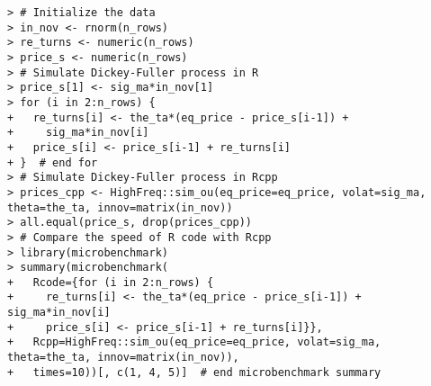 \documentclass[10pt]{beamer}\usepackage[]{graphicx}\usepackage[]{color}
\makeatletter
\newenvironment{kframe}{%
 \def\at@end@of@kframe{}%
 \ifinner\ifhmode%
  \def\at@end@of@kframe{\end{minipage}}%
  \begin{minipage}{\columnwidth}%
 \fi\fi%
 \def\FrameCommand##1{\hskip\@totalleftmargin \hskip-\fboxsep
 \colorbox{shadecolor}{##1}\hskip-\fboxsep
     \hskip-\linewidth \hskip-\@totalleftmargin \hskip\columnwidth}%
 \MakeFramed {\advance\hsize-\width
   \@totalleftmargin\z@ \linewidth\hsize
   \@setminipage}}%
 {\par\unskip\endMakeFramed%
 \at@end@of@kframe}
\newenvironment{knitrout}{}{} %
\makeatother
\begin{document}
\begin{frame}[fragile,t]{\subsecname}
\begin{block}{}
\begin{columns}[T]
\begin{knitrout}
\begin{kframe}
\begin{verbatim}
> # Initialize the data
> in_nov <- rnorm(n_rows)
> re_turns <- numeric(n_rows)
> price_s <- numeric(n_rows)
> # Simulate Dickey-Fuller process in R
> price_s[1] <- sig_ma*in_nov[1]
> for (i in 2:n_rows) {
+   re_turns[i] <- the_ta*(eq_price - price_s[i-1]) + 
+     sig_ma*in_nov[i]
+   price_s[i] <- price_s[i-1] + re_turns[i]
+ }  # end for
> # Simulate Dickey-Fuller process in Rcpp
> prices_cpp <- HighFreq::sim_ou(eq_price=eq_price, volat=sig_ma, theta=the_ta, innov=matrix(in_nov))
> all.equal(price_s, drop(prices_cpp))
> # Compare the speed of R code with Rcpp
> library(microbenchmark)
> summary(microbenchmark(
+   Rcode={for (i in 2:n_rows) {
+     re_turns[i] <- the_ta*(eq_price - price_s[i-1]) + sig_ma*in_nov[i]
+     price_s[i] <- price_s[i-1] + re_turns[i]}},
+   Rcpp=HighFreq::sim_ou(eq_price=eq_price, volat=sig_ma, theta=the_ta, innov=matrix(in_nov)),
+   times=10))[, c(1, 4, 5)]  # end microbenchmark summary
\end{verbatim}
\end{kframe}
\end{knitrout}
  \end{columns}
\end{block}

\end{frame}


\end{document}
